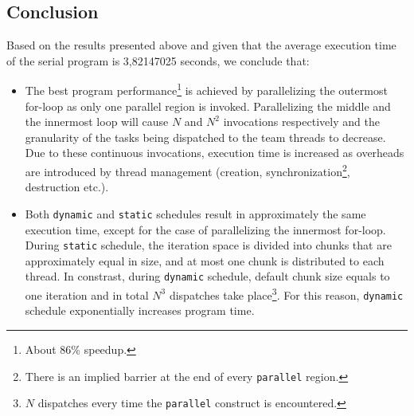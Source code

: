 \documentclass{article}
\def\code#1{\texttt{#1}}
\begin{document}
\subsection{Conclusion}
Based on the results presented above and given that the average execution time of the serial
program is 3,82147025 seconds, we conclude that:

\begin{itemize}
 \item The best program performance\footnote{About 86\% speedup.} is achieved by
       parallelizing the outermost for-loop as only one parallel region is invoked.
       Parallelizing the middle and the innermost loop will cause $N$ and $N^2$
       invocations respectively and the granularity of the tasks being dispatched to
       the team threads to decrease. Due to these continuous invocations, execution
       time is increased as overheads are introduced by thread management (creation, 
       synchronization\footnote{There is an implied barrier at the end of every
       \code{parallel} region.}, destruction etc.).
 \item Both \code{dynamic} and \code{static} schedules result in approximately the
       same execution time, except for the case of parallelizing the innermost 
       for-loop. During \code{static} schedule, the iteration space is divided
       into chunks that are approximately equal in size, and at most one chunk
       is distributed to each thread. In constrast, during \code{dynamic} schedule,
       default chunk size equals to one iteration and in total $N^3$ dispatches
       take place\footnote{$N$ dispatches every time the \code{parallel} construct
       is encountered.}. For this reason, \code{dynamic} schedule exponentially
       increases program time.
\end{itemize}
\end{document}
